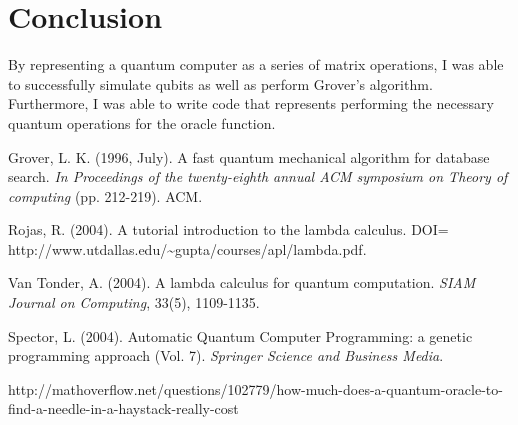 \documentclass[11pt]{article}
\begin{document}
\section{Conclusion}

By representing a quantum computer as a series of matrix operations, I was able to successfully simulate qubits as well as perform Grover's algorithm. Furthermore, I was able to write code that represents performing the necessary quantum operations for the oracle function.

\begin{thebibliography}{9}

	Grover, L. K. (1996, July). A fast quantum mechanical algorithm for database search. \emph{In Proceedings of the twenty-eighth annual ACM symposium on Theory of computing} (pp. 212-219). ACM.
  
  Rojas, R. (2004). A tutorial introduction to the lambda calculus. DOI= http://www.utdallas.edu/\textasciitilde gupta/courses/apl/lambda.pdf.
  
  Van Tonder, A. (2004). A lambda calculus for quantum computation. \emph{SIAM Journal on Computing}, 33(5), 1109-1135.
  
  Spector, L. (2004). Automatic Quantum Computer Programming: a genetic programming approach (Vol. 7). \emph{Springer Science and Business Media}.
  
  http://mathoverflow.net/questions/102779/how-much-does-a-quantum-oracle-to-find-a-needle-in-a-haystack-really-cost

\end{thebibliography}
\end{document}
